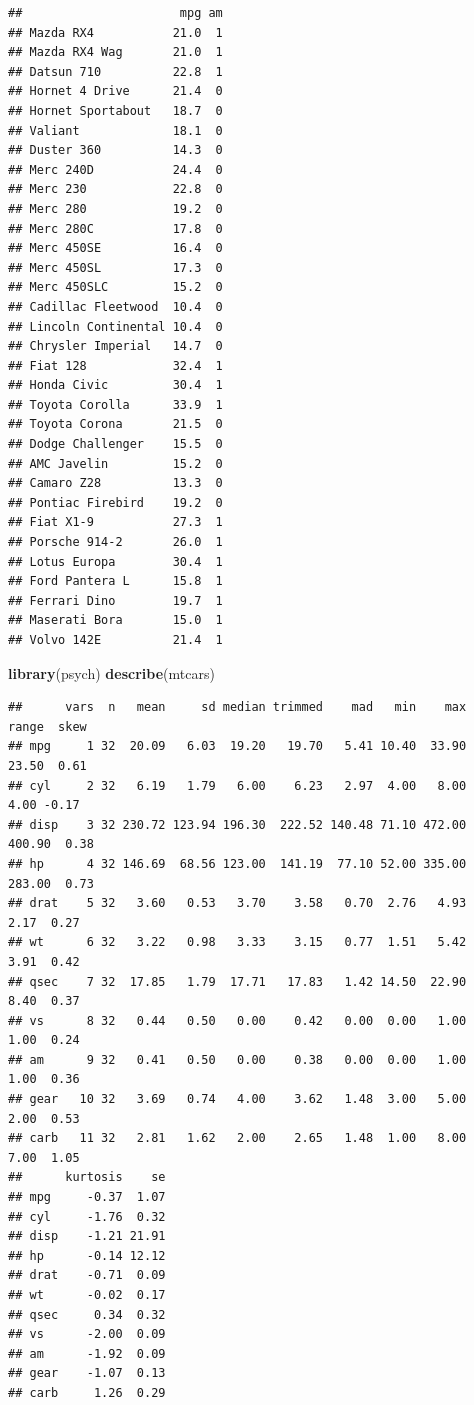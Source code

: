 \documentclass[]{article}
\newenvironment{Shaded}{\begin{snugshade}}{\end{snugshade}}
\newcommand{\KeywordTok}[1]{\textcolor[rgb]{0.13,0.29,0.53}{\textbf{{#1}}}}
\newcommand{\NormalTok}[1]{{#1}}
\numberwithin{equation}{section}
\begin{document}
\begin{verbatim}
##                      mpg am
## Mazda RX4           21.0  1
## Mazda RX4 Wag       21.0  1
## Datsun 710          22.8  1
## Hornet 4 Drive      21.4  0
## Hornet Sportabout   18.7  0
## Valiant             18.1  0
## Duster 360          14.3  0
## Merc 240D           24.4  0
## Merc 230            22.8  0
## Merc 280            19.2  0
## Merc 280C           17.8  0
## Merc 450SE          16.4  0
## Merc 450SL          17.3  0
## Merc 450SLC         15.2  0
## Cadillac Fleetwood  10.4  0
## Lincoln Continental 10.4  0
## Chrysler Imperial   14.7  0
## Fiat 128            32.4  1
## Honda Civic         30.4  1
## Toyota Corolla      33.9  1
## Toyota Corona       21.5  0
## Dodge Challenger    15.5  0
## AMC Javelin         15.2  0
## Camaro Z28          13.3  0
## Pontiac Firebird    19.2  0
## Fiat X1-9           27.3  1
## Porsche 914-2       26.0  1
## Lotus Europa        30.4  1
## Ford Pantera L      15.8  1
## Ferrari Dino        19.7  1
## Maserati Bora       15.0  1
## Volvo 142E          21.4  1
\end{verbatim}

\begin{Shaded}
\begin{Highlighting}[]
\KeywordTok{library}\NormalTok{(psych)}
\KeywordTok{describe}\NormalTok{(mtcars)}
\end{Highlighting}
\end{Shaded}

\begin{verbatim}
##      vars  n   mean     sd median trimmed    mad   min    max  range  skew
## mpg     1 32  20.09   6.03  19.20   19.70   5.41 10.40  33.90  23.50  0.61
## cyl     2 32   6.19   1.79   6.00    6.23   2.97  4.00   8.00   4.00 -0.17
## disp    3 32 230.72 123.94 196.30  222.52 140.48 71.10 472.00 400.90  0.38
## hp      4 32 146.69  68.56 123.00  141.19  77.10 52.00 335.00 283.00  0.73
## drat    5 32   3.60   0.53   3.70    3.58   0.70  2.76   4.93   2.17  0.27
## wt      6 32   3.22   0.98   3.33    3.15   0.77  1.51   5.42   3.91  0.42
## qsec    7 32  17.85   1.79  17.71   17.83   1.42 14.50  22.90   8.40  0.37
## vs      8 32   0.44   0.50   0.00    0.42   0.00  0.00   1.00   1.00  0.24
## am      9 32   0.41   0.50   0.00    0.38   0.00  0.00   1.00   1.00  0.36
## gear   10 32   3.69   0.74   4.00    3.62   1.48  3.00   5.00   2.00  0.53
## carb   11 32   2.81   1.62   2.00    2.65   1.48  1.00   8.00   7.00  1.05
##      kurtosis    se
## mpg     -0.37  1.07
## cyl     -1.76  0.32
## disp    -1.21 21.91
## hp      -0.14 12.12
## drat    -0.71  0.09
## wt      -0.02  0.17
## qsec     0.34  0.32
## vs      -2.00  0.09
## am      -1.92  0.09
## gear    -1.07  0.13
## carb     1.26  0.29
\end{verbatim}
\end{document}
